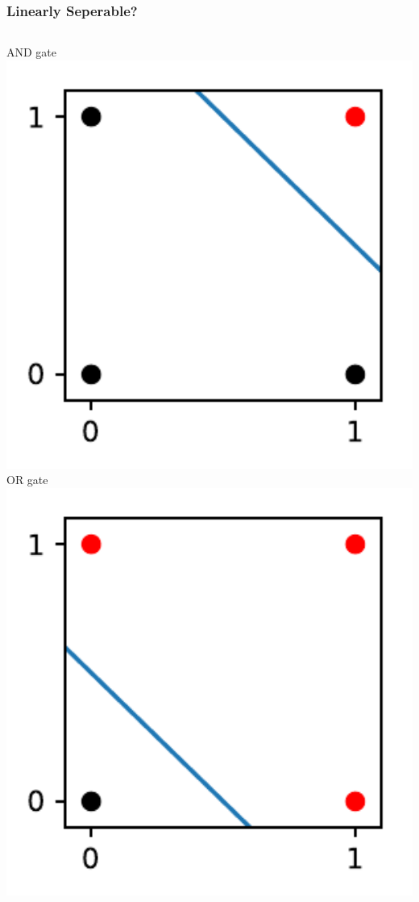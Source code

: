 \documentclass[aspectratio=169]{beamer}
\begin{document}
\begin{frame}
	\frametitle{Linearly Seperable?}
	\begin{columns}[t]
		{\large AND gate}
		\onslide<2->
		\includegraphics[width=1.0\textwidth]{imgs/and.pdf}
		{\onslide<1-> \large OR gate}
		\onslide<3->
		\includegraphics[width=1.0\textwidth]{imgs/or.pdf}

\end{columns}
\end{frame}
\end{document}

